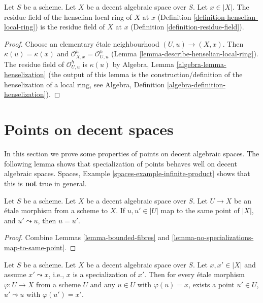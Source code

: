 \begin{lemma}
\label{lemma-residue-field-henselian-local-ring}
Let $S$ be a scheme. Let $X$ be a decent algebraic space over $S$.
Let $x \in |X|$. The residue field of the
henselian local ring of $X$ at $x$
(Definition \ref{definition-henselian-local-ring})
is the residue field of $X$ at $x$
(Definition \ref{definition-residue-field}).
\end{lemma}

\begin{proof}
Choose an elementary \'etale neighbourhood $(U, u) \to (X, x)$.
Then $\kappa(u) = \kappa(x)$ and
$\mathcal{O}_{X, x}^h = \mathcal{O}_{U, u}^h$
(Lemma \ref{lemma-describe-henselian-local-ring}).
The residue field of $\mathcal{O}_{U, u}^h$
is $\kappa(u)$ by Algebra, Lemma \ref{algebra-lemma-henselization}
(the output of this lemma is the construction/definition
of the henselization of a local ring, see
Algebra, Definition \ref{algebra-definition-henselization}).
\end{proof}





\section{Points on decent spaces}
\label{section-points}

\noindent
In this section we prove some properties of points on decent algebraic spaces.
The following lemma shows that specialization of points behaves well
on decent algebraic spaces.
Spaces, Example \ref{spaces-example-infinite-product}
shows that this is {\bf not} true in general.

\begin{lemma}
\label{lemma-decent-no-specializations-map-to-same-point}
Let $S$ be a scheme. Let $X$ be a decent algebraic space over $S$.
Let $U \to X$ be an \'etale morphism from a scheme to $X$.
If $u, u' \in |U|$ map to the same point of $|X|$, and
$u' \leadsto u$, then $u = u'$.
\end{lemma}

\begin{proof}
Combine Lemmas \ref{lemma-bounded-fibres} and
\ref{lemma-no-specializations-map-to-same-point}.
\end{proof}

\begin{lemma}
\label{lemma-decent-specialization}
Let $S$ be a scheme. Let $X$ be a decent algebraic space over $S$.
Let $x, x' \in |X|$ and assume $x' \leadsto x$, i.e., $x$ is a
specialization of $x'$. Then for every \'etale morphism
$\varphi : U \to X$ from a scheme $U$ and any $u \in U$ with
$\varphi(u) = x$, exists a point $u'\in U$, $u' \leadsto u$ with
$\varphi(u') = x'$.
\end{lemma}


